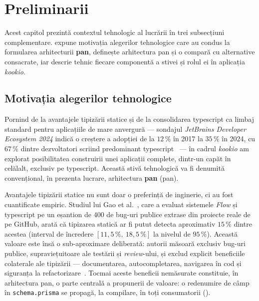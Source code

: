 \section{Preliminarii}\label{cap:preliminarii}

Acest capitol prezintă contextul tehnologic al lucrării în trei subsecțiuni complementare.
 expune motivația alegerilor tehnologice care au condus la formularea arhitecturii \textbf{\gls{pan}},  definește arhitectura \gls{pan} și o compară cu alternative consacrate, iar  descrie tehnic fiecare componentă a stivei și rolul ei în aplicația \textit{\gls{kookio}}.

\subsection{Motivația alegerilor tehnologice}\label{sec:motivatia}

Pornind de la avantajele tipizării statice și de la consolidarea \gls{typescript} ca limbaj standard pentru aplicațiile de mare anvergură --- sondajul \textit{JetBrains Developer Ecosystem 2024} indică o creștere a adopției de la \(12\,\%\) în 2017 la \(35\,\%\) în 2024, cu \(67\,\%\) dintre dezvoltatori scriind predominant \gls{typescript}~\cite{jetbrainsJsSurvey2024} --- în cadrul \textit{\gls{kookio}} am explorat posibilitatea construirii unei aplicații complete, dintr-un capăt în celălalt, exclusiv pe \gls{typescript}.
Această stivă tehnologică va fi denumită convențional, în prezenta lucrare, arhitectura \textbf{\gls{pan}} (\acrlong{pan}).

Avantajele tipizării statice nu sunt doar o preferință de inginerie, ci au fost cuantificate empiric. Studiul lui Gao et al.~\cite{gao2017type}, care a evaluat sistemele \textit{Flow} și \gls{typescript} pe un eșantion de 400 de bug-uri publice extrase din proiecte reale de pe GitHub, arată că tipizarea statică ar fi putut detecta aproximativ \(15\,\%\) dintre acestea (interval de încredere \([11{,}5\,\%,\ 18{,}5\,\%]\) la nivelul de \(95\,\%\)). Această valoare este însă o sub-aproximare deliberată: autorii măsoară exclusiv bug-uri publice, supraviețuitoare ale testării și \textit{review}-ului, și exclud explicit beneficiile colaterale ale tipizării --- documentarea, autocompletarea, navigarea în cod și siguranța la refactorizare~\cite{gao2017type}. Tocmai aceste beneficii nemăsurate constituie, în arhitectura \gls{pan}, o parte centrală a propunerii de valoare: o redenumire de câmp în \texttt{schema.prisma} se propagă, la compilare, în toți consumatorii ().

